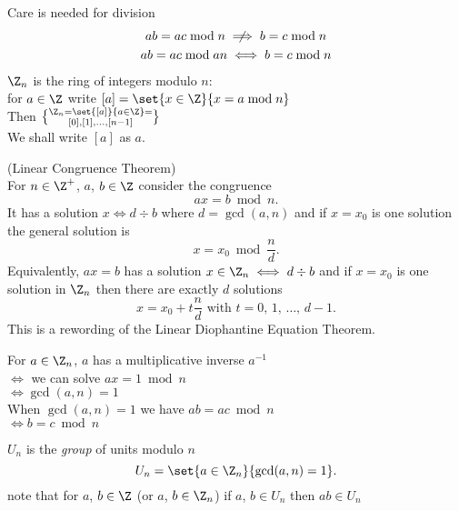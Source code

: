Care is needed for division
\begin{gather*}
ab=ac\bmod n \centernot\implies b=c\bmod n \\
ab=ac\bmod an \iff b=c\bmod n
\end{gather*}
 $\Z_n$ is the ring of integers modulo $n$: \\
for $a\in\Z$ write $[a]=\set{x\in\Z}{x=a\bmod n}$ \\
Then $\Z_n=\set{[a]}{a\in\Z}=\brace{[0],[1],\dotsc,[n-1]}$ \\
We shall write $[a]$ as $a$.

\thm (Linear Congruence Theorem) \\
For $n\in\Z^+$, $a$, $b\in\Z$ consider the congruence
\[ ax = b \bmod n . \]
It has a solution $x\iff d\div b$ where $d=\gcd(a,n)$ and if $x=x_0$ is one solution the general solution is
\[ x = x_0 \bmod \frac{n}{d} . \]
Equivalently, $ax=b$ has a solution $x\in\Z_n\iff d\div b$ and if $x=x_0$ is one solution in $\Z_n$ then there are exactly $d$ solutions
\[ x = x_0 + t\frac nd \text{ with $t=0$, $1$, $\dotsc$, $d-1$} . \]
\pf This is a rewording of the Linear Diophantine Equation Theorem.

\cor For $a\in\Z_n$, $a$ has a multiplicative inverse $a^{-1}$ \\
$\iff$ we can solve $ax=1\bmod n$ \\
$\iff\gcd(a,n)=1$ \\
When $\gcd(a,n)=1$ we have $ab=ac\bmod n$ \\
$\iff b=c\bmod n$

 $U_n$ is the \emph{group} of units modulo $n$
\[ U_n = \set{a\in\Z_n}{\gcd(a,n)=1} . \]
note that for $a$, $b\in\Z$ (or $a$, $b\in\Z_n$) if $a$, $b\in U_n$ then $ab\in U_n$


